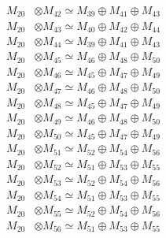 \begin{align*}
M_{20} &\otimes M_{42} \simeq M_{39} \oplus M_{41} \oplus M_{43} \\
M_{20} &\otimes M_{43} \simeq M_{40} \oplus M_{42} \oplus M_{44} \\
M_{20} &\otimes M_{44} \simeq M_{39} \oplus M_{41} \oplus M_{43} \\
M_{20} &\otimes M_{45} \simeq M_{46} \oplus M_{48} \oplus M_{50} \\
M_{20} &\otimes M_{46} \simeq M_{45} \oplus M_{47} \oplus M_{49} \\
M_{20} &\otimes M_{47} \simeq M_{46} \oplus M_{48} \oplus M_{50} \\
M_{20} &\otimes M_{48} \simeq M_{45} \oplus M_{47} \oplus M_{49} \\
M_{20} &\otimes M_{49} \simeq M_{46} \oplus M_{48} \oplus M_{50} \\
M_{20} &\otimes M_{50} \simeq M_{45} \oplus M_{47} \oplus M_{49} \\
M_{20} &\otimes M_{51} \simeq M_{52} \oplus M_{54} \oplus M_{56} \\
M_{20} &\otimes M_{52} \simeq M_{51} \oplus M_{53} \oplus M_{55} \\
M_{20} &\otimes M_{53} \simeq M_{52} \oplus M_{54} \oplus M_{56} \\
M_{20} &\otimes M_{54} \simeq M_{51} \oplus M_{53} \oplus M_{55} \\
M_{20} &\otimes M_{55} \simeq M_{52} \oplus M_{54} \oplus M_{56} \\
M_{20} &\otimes M_{56} \simeq M_{51} \oplus M_{53} \oplus M_{55} \\
\end{align*}


